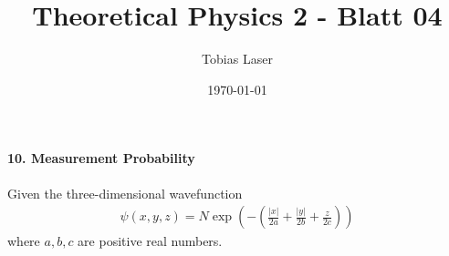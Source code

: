 \documentclass[11pt,a4paper]{scrartcl}
\newcommand{\abs}[1]{\left| #1 \right|}
\begin{document}
\title{Theoretical Physics 2 - Blatt 04}
\author{Tobias Laser}
\date{\today}
\maketitle
\vfill
\thispagestyle{empty}


\paragraph{10. Measurement Probability}
Given the three-dimensional wavefunction
\begin{align*}
    \psi(x, y, z) = N \exp \left(-\left(\frac{\abs{x}}{2a} + \frac{\abs{y}}{2b} + \frac{z}{2c}\right)\right)
\end{align*}
where $a, b, c$ are positive real numbers.
\end{document}
